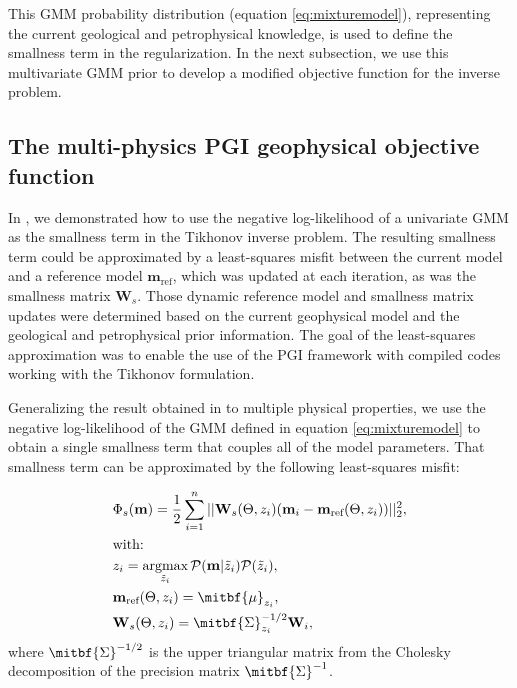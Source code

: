 \documentclass[extra, mreferee]{gji_joint} %
\begin{document}
This GMM probability distribution (equation \eqref{eq:mixturemodel}), representing the current geological and petrophysical knowledge, is used to define the smallness term in the regularization. In the next subsection, we use this multivariate GMM prior to develop a modified objective function for the inverse problem.

\subsection{The multi-physics PGI geophysical objective function}

In \citet{ggz389}, we demonstrated how to use the negative log-likelihood of a univariate GMM as the smallness term in the Tikhonov inverse problem. The resulting smallness term could be approximated by a least-squares misfit between the current model and a reference model $\mathbf{m}_{\text{ref}}$, which was updated at each iteration, as was the smallness matrix $\mathbf{W}_s$. Those dynamic reference model and smallness matrix updates were determined based on the current geophysical model and the geological and petrophysical prior information. The goal of the least-squares approximation was to enable the use of the PGI framework with compiled codes working with the Tikhonov formulation.

Generalizing the result obtained in \citet{ggz389} to multiple physical properties, we use the negative log-likelihood of the GMM defined in equation \eqref{eq:mixturemodel} to obtain a single smallness term that couples all of the model parameters. That smallness term can be approximated by the following least-squares misfit:

\begin{align}
&\Phi_s(\mathbf{m}) = \frac{1}{2}\sum_{i=1}^n||\mathbf{W}_{s}(\Theta, z_i)(\mathbf{m}_i-\mathbf{m}_{\text{ref}}(\Theta, z_i))||_2^2 \label{eq:smallness_petro},\\
&\text{with:}\nonumber\\
&z_i = \mathop{\hbox{argmax}}\limits_{\tilde{z}_i}\mathcal{P}(\mathbf{m}|\tilde{z}_i)\mathcal{P}(\tilde{z}_i) \label{eq:membership}, \\
&\mathbf{m}_{\text{ref}}(\Theta, z_i) = \mitbf{\mu}_{z_i} \label{eq:mref_update},\\
&\mathbf{W}_{s}(\Theta, z_i) = \mitbf{\Sigma}_{z_i}^{-1/2} \mathbf{W}_i\label{eq:Ws_update},
\end{align}
where $\mitbf{\Sigma}^{-1/2}$ is the upper triangular matrix from the Cholesky decomposition of the precision matrix $\mitbf{\Sigma}^{-1}$.
\end{document}
